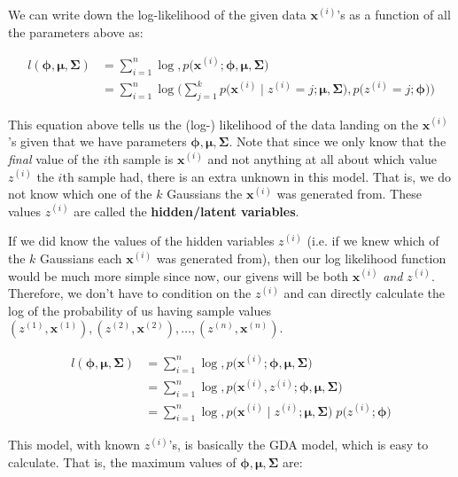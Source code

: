       We can write down the log-likelihood of the given data $\mathbf{x}^{(i)}$'s as a function of all the parameters above as:

      \begin{align*}
        l (\boldsymbol{\phi}, \bm{\mu}, \bm{\Sigma}) & = \sum_{i=1}^n \log, p\big( \mathbf{x}^{(i)} ;  \boldsymbol{\phi}, \bm{\mu}, \bm{\Sigma} \big) \\
        & = \sum_{i=1}^n \log \bigg( \sum_{j=1}^k  p\big( \mathbf{x}^{(i)} \mid z^{(i)} = j ; \bm{\mu}, \bm{\Sigma} \big) , p\big( z^{(i)} = j; \boldsymbol{\phi}\big) \bigg)
      \end{align*}

      This equation above tells us the (log-) likelihood of the data landing on the $\mathbf{x}^{(i)}$'s given that we have parameters $\boldsymbol{\phi}, \bm{\mu}, \bm{\Sigma}$. Note that since we only know that the \textit{final} value of the $i$th sample is $\mathbf{x}^{(i)}$ and not anything at all about which value $z^{(i)}$ the $i$th sample had, there is an extra unknown in this model. That is, we do not know which one of the $k$ Gaussians the $\mathbf{x}^{(i)}$ was generated from. These values $z^{(i)}$ are called the \textbf{hidden/latent variables}.

      If we did know the values of the hidden variables $z^{(i)}$ (i.e. if we knew which of the $k$ Gaussians each $\mathbf{x}^{(i)}$ was generated from), then our log likelihood function would be much more simple since now, our givens will be both $\mathbf{x}^{(i)}$ \textit{and} $z^{(i)}$. Therefore, we don't have to condition on the $z^{(i)}$ and can directly calculate the log of the probability of us having sample values $(z^{(1)}, \mathbf{x}^{(1)}), (z^{(2)}, \mathbf{x}^{(2)}), \ldots, (z^{(n)}, \mathbf{x}^{(n)})$.

      \begin{align*}
        l(\boldsymbol{\phi}, \bm{\mu}, \bm{\Sigma}) & = \sum_{i=1}^n \log , p\big( \mathbf{x}^{(i)}; \boldsymbol{\phi}, \bm{\mu} ,\bm{\Sigma}\big) \\
        & = \sum_{i=1}^n \log, p\big( \mathbf{x}^{(i)}, z^{(i)}; \boldsymbol{\phi}, \bm{\mu} ,\bm{\Sigma}\big) \\
        & = \sum_{i=1}^n \log, p\big( \mathbf{x}^{(i)} \mid z^{(i)}; \bm{\mu}, \bm{\Sigma}) \; p\big( z^{(i)}; \boldsymbol{\phi} \big)
      \end{align*}

      This model, with known $z^{(i)}$'s, is basically the GDA model, which is easy to calculate. That is, the maximum values of $\boldsymbol{\phi}, \bm{\mu}, \bm{\Sigma}$ are:

